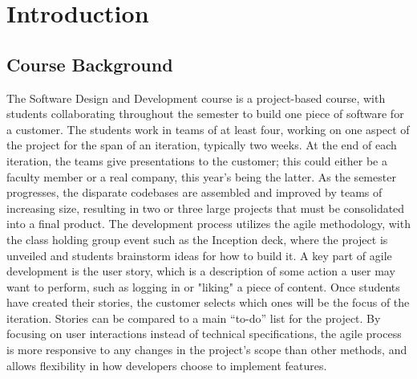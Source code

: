 \documentclass[12pt]{article}
\begin{document}
\newpage

\setcounter{page}{1}


\section{Introduction}\label{sec:introduction}
\subsection{Course Background}\label{sec:course_background}
 The Software Design and Development course is a project-based course, with students collaborating throughout the semester to build one piece of software for a customer. The students work in teams of at least four, working on one aspect of the project for the span of an iteration, typically two weeks. At the end of each iteration, the teams give presentations to the customer; this could either be a faculty member or a real company, this year's being the latter. As the semester progresses, the disparate codebases are assembled and improved by teams of increasing size, resulting in two or three large projects that must be consolidated into a final product. The development process utilizes the agile methodology, with the class holding group event such as the Inception deck, where the project is unveiled and students brainstorm ideas for how to build it. A key part of agile development is the user story, which is a description of some action a user may want to perform, such as logging in or "liking" a piece of content. Once students have created their stories, the customer selects which ones will be the focus of the iteration. Stories can be compared to a main ``to-do'' list for the project. By focusing on user interactions instead of technical specifications, the agile process is more responsive to any changes in the project's scope than other methods, and allows flexibility in how developers choose to implement features.
\end{document}
